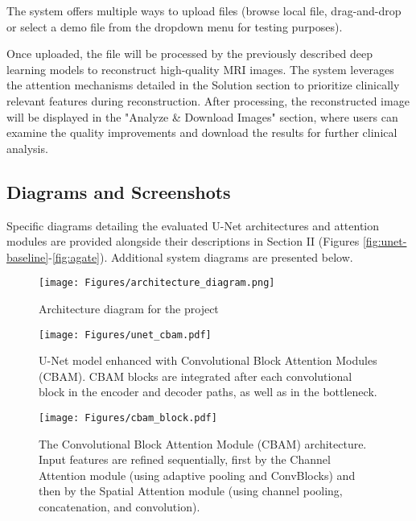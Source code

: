 \documentclass[
	letterpaper, %
]{jdf}
\begin{document}
The system offers multiple ways to upload files (browse local file, drag-and-drop or select a demo file from the dropdown menu for testing purposes).

Once uploaded, the file will be processed by the previously described deep learning models to reconstruct high-quality MRI images. The system leverages the attention mechanisms detailed in the Solution section to prioritize clinically relevant features during reconstruction.
After processing, the reconstructed image will be displayed in the "Analyze \& Download Images" section, where users can examine the quality improvements and download the results for further clinical analysis.

\subsection{Diagrams and Screenshots}

Specific diagrams detailing the evaluated U-Net architectures and attention modules are provided alongside their descriptions in Section II (Figures \ref{fig:unet-baseline}-\ref{fig:agate}). Additional system diagrams are presented below.

\begin{figure}[h]
\begin{center}
   \texttt{[image: Figures/architecture\_diagram.png]}
\end{center}
   \caption{Architecture diagram for the project}
\label{fig:architecture_diagram}
\end{figure}

\begin{figure}[htbp] %
    \centering %
    \texttt{[image: Figures/unet\_cbam.pdf]}
    \caption{U-Net model enhanced with Convolutional Block Attention Modules (CBAM). CBAM blocks are integrated after each convolutional block in the encoder and decoder paths, as well as in the bottleneck.}
    \label{fig:unet-cbam}
\end{figure}

\begin{figure}[htbp] %
    \centering %
    \texttt{[image: Figures/cbam\_block.pdf]}
    \caption{The Convolutional Block Attention Module (CBAM) architecture. Input features are refined sequentially, first by the Channel Attention module (using adaptive pooling and ConvBlocks) and then by the Spatial Attention module (using channel pooling, concatenation, and convolution).}
    \label{fig:cbam}
\end{figure}
\end{document}
